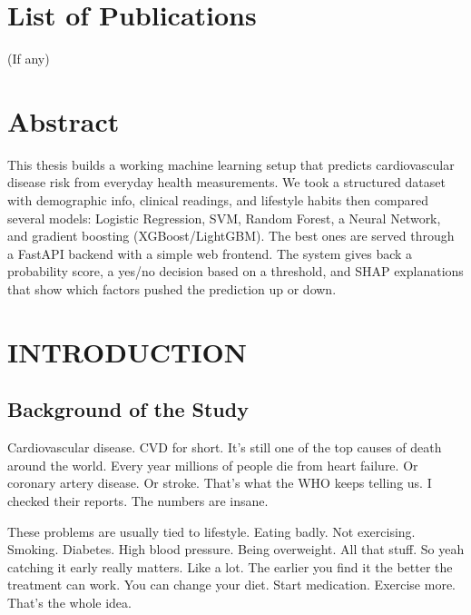\documentclass[12pt, a4paper, oneside]{book}
\begin{document}
\clearpage
\thispagestyle{plain}
\chapter*{List of Publications}
(If any)

\clearpage
\thispagestyle{plain}
\chapter*{Abstract}
This thesis builds a working machine learning setup that predicts cardiovascular disease risk from everyday health measurements. We took a structured dataset with demographic info, clinical readings, and lifestyle habits then compared several models: Logistic Regression, SVM, Random Forest, a Neural Network, and gradient boosting (XGBoost/LightGBM). The best ones are served through a FastAPI backend with a simple web frontend. The system gives back a probability score, a yes/no decision based on a threshold, and SHAP explanations that show which factors pushed the prediction up or down.

\mainmatter
{}
\setcounter{page}{1}

\chapter{INTRODUCTION}

\section{Background of the Study}

Cardiovascular disease. CVD for short. It's still one of the top causes of death around the world. Every year millions of people die from heart failure. Or coronary artery disease. Or stroke. That's what the WHO keeps telling us. I checked their reports. The numbers are insane.

These problems are usually tied to lifestyle. Eating badly. Not exercising. Smoking. Diabetes. High blood pressure. Being overweight. All that stuff. So yeah catching it early really matters. Like a lot. The earlier you find it the better the treatment can work. You can change your diet. Start medication. Exercise more. That's the whole idea.
\end{document}
